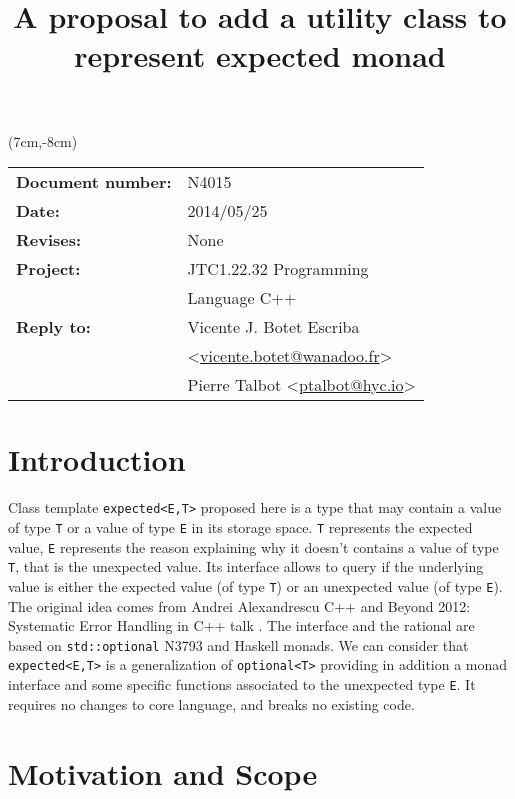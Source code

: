 \documentclass[a4paper,10pt]{article}
\title{A proposal to add a utility class to represent expected monad}
\author{}
\date{}
\newcommand{\cpp}[1]{\lstinline{#1}}
\begin{document}
\maketitle
\begin{textblock*}{9cm}(7cm,-8cm)
\begin{tabular}{l l}
\textbf{Document number:} & N4015 \\
\textbf{Date:}  & 2014/05/25 \\
\textbf{Revises:} & None \\
\textbf{Project:} & JTC1.22.32 Programming \\
 & Language C++ \\
\textbf{Reply to:} & Vicente J. Botet Escriba \\
 & <\href{mailto:vicente.botet@wanadoo.fr}{vicente.botet@wanadoo.fr}> \\
 & Pierre Talbot <\href{mailto:ptalbot@hyc.io}{ptalbot@hyc.io}>
\end{tabular}
\end{textblock*}

\vspace{-6em}
\setcounter{tocdepth}{1}
\tableofcontents

\section{Introduction}

Class template \cpp{expected<E,T>} proposed here is a type that may contain a value of type \cpp{T} or a value of type \cpp{E} in its storage space. \cpp{T} represents the expected value, \cpp{E} represents the reason explaining why it doesn't contains a value of type \cpp{T}, that is the unexpected value. Its interface allows to query if the underlying value is either the expected value (of type \cpp{T}) or an unexpected value (of type \cpp{E}). The original idea comes from Andrei Alexandrescu C++ and Beyond 2012: Systematic Error Handling in C++ talk \cite{AlexandrescuExpected}. The interface and the rational are based on \cpp{std::optional} N3793 \cite{OptionalRev5} and Haskell monads. We can consider that \cpp{expected<E,T>} is a generalization of \cpp{optional<T>} providing in addition a monad interface and some specific functions associated to the unexpected type \cpp{E}. It requires no changes to core language, and breaks no existing code.

\section{Motivation and Scope}
\label{motiv-scope}
\end{document}
